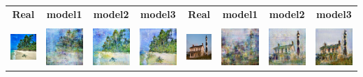 \documentclass[10pt,twocolumn,letterpaper]{article}
\begin{document}
\begin{table}
	\centering
	\begin{tabular}{c c c c | c c c c}
		\textbf{Real} & 
		\textbf{model1} & 
		\textbf{model2} & 
		\textbf{model3} & 
		\textbf{Real} & 
		\textbf{model1} & 
		\textbf{model2} & 
		\textbf{model3} \\
		&&&&&&&\\
		\includegraphics[width=5em]{815_real.jpg}& 
		\includegraphics[width=5em]{815_leo.jpg} & 
		\includegraphics[width=5em]{815_gen.jpg} &
		\includegraphics[width=5em]{815_unet.jpg} &
		\includegraphics[width=5em]{1326_real.jpg}& 
		\includegraphics[width=5em]{1326_leo.jpg} & 
		\includegraphics[width=5em]{1326_gen.jpg} &
		\includegraphics[width=5em]{1326_unet.jpg} \\

\end{tabular}
\end{table}
\end{document}
